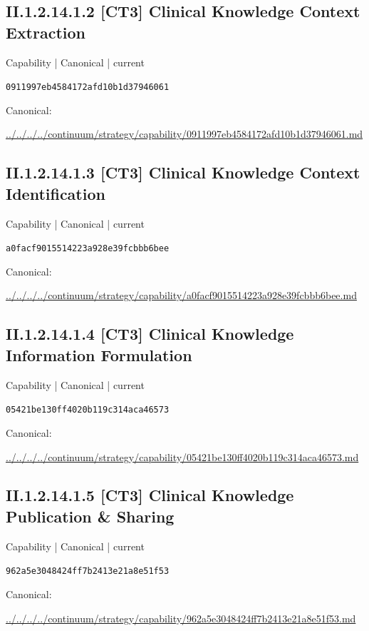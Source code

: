 \documentclass[10pt,a4paper]{article}
\begin{document}
\subsection*{II.1.2.14.1.2 [CT3] Clinical Knowledge Context Extraction}
{\small Capability | Canonical | current}\par
\texttt{0911997eb4584172afd10b1d37946061}\par
Canonical: \par
{\footnotesize\url{../../../../continuum/strategy/capability/0911997eb4584172afd10b1d37946061.md}}\par
\subsection*{II.1.2.14.1.3 [CT3] Clinical Knowledge Context Identification}
{\small Capability | Canonical | current}\par
\texttt{a0facf9015514223a928e39fcbbb6bee}\par
Canonical: \par
{\footnotesize\url{../../../../continuum/strategy/capability/a0facf9015514223a928e39fcbbb6bee.md}}\par
\subsection*{II.1.2.14.1.4 [CT3] Clinical Knowledge Information Formulation}
{\small Capability | Canonical | current}\par
\texttt{05421be130ff4020b119c314aca46573}\par
Canonical: \par
{\footnotesize\url{../../../../continuum/strategy/capability/05421be130ff4020b119c314aca46573.md}}\par
\subsection*{II.1.2.14.1.5 [CT3] Clinical Knowledge Publication \& Sharing}
{\small Capability | Canonical | current}\par
\texttt{962a5e3048424ff7b2413e21a8e51f53}\par
Canonical: \par
{\footnotesize\url{../../../../continuum/strategy/capability/962a5e3048424ff7b2413e21a8e51f53.md}}\par
\end{document}
